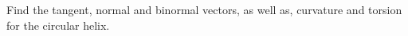 \documentclass[main.tex]{subfiles}
\begin{document}
\begin{ex}{1.3}
Find the tangent, normal and binormal vectors, as well as, curvature and torsion
for the circular helix.
\end{ex}

\begin{sol}

\end{sol}
\end{document}
